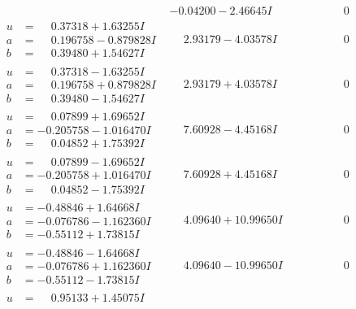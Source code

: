 \documentclass[1p]{elsarticle_modified}
\theoremstyle{definition}
\begin{document}
$$\begin{array}{c|c|c}
 & -0.04200 - 2.46645 I & \phantom{-0.000000 } 0 \\ \hline\begin{aligned}
u &= \phantom{-}0.37318 + 1.63255 I \\
a &= \phantom{-}0.196758 - 0.879828 I \\
b &= \phantom{-}0.39480 + 1.54627 I\end{aligned}
 & \phantom{-}2.93179 - 4.03578 I & \phantom{-0.000000 } 0 \\ \hline\begin{aligned}
u &= \phantom{-}0.37318 - 1.63255 I \\
a &= \phantom{-}0.196758 + 0.879828 I \\
b &= \phantom{-}0.39480 - 1.54627 I\end{aligned}
 & \phantom{-}2.93179 + 4.03578 I & \phantom{-0.000000 } 0 \\ \hline\begin{aligned}
u &= \phantom{-}0.07899 + 1.69652 I \\
a &= -0.205758 - 1.016470 I \\
b &= \phantom{-}0.04852 + 1.75392 I\end{aligned}
 & \phantom{-}7.60928 - 4.45168 I & \phantom{-0.000000 } 0 \\ \hline\begin{aligned}
u &= \phantom{-}0.07899 - 1.69652 I \\
a &= -0.205758 + 1.016470 I \\
b &= \phantom{-}0.04852 - 1.75392 I\end{aligned}
 & \phantom{-}7.60928 + 4.45168 I & \phantom{-0.000000 } 0 \\ \hline\begin{aligned}
u &= -0.48846 + 1.64668 I \\
a &= -0.076786 - 1.162360 I \\
b &= -0.55112 + 1.73815 I\end{aligned}
 & \phantom{-}4.09640 + 10.99650 I & \phantom{-0.000000 } 0 \\ \hline\begin{aligned}
u &= -0.48846 - 1.64668 I \\
a &= -0.076786 + 1.162360 I \\
b &= -0.55112 - 1.73815 I\end{aligned}
 & \phantom{-}4.09640 - 10.99650 I & \phantom{-0.000000 } 0 \\ \hline\begin{aligned}
u &= \phantom{-}0.95133 + 1.45075 I \\

\end{aligned}
\end{array}$$
\end{document}

